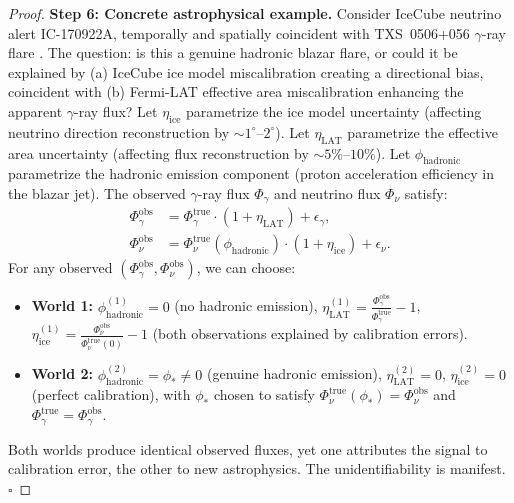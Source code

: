 \documentclass[11pt,a4paper]{article}
\theoremstyle{definition}
\begin{document}
\begin{proof}
\textbf{Step 6: Concrete astrophysical example.}
Consider IceCube neutrino alert IC-170922A, temporally and spatially coincident with TXS~0506+056 $\gamma$-ray flare \cite{IceCubeNeutrino2018}. The question: is this a genuine hadronic blazar flare, or could it be explained by (a) IceCube ice model miscalibration creating a directional bias, coincident with (b) Fermi-LAT effective area miscalibration enhancing the apparent $\gamma$-ray flux?
Let $\eta_{\mathrm{ice}}$ parametrize the ice model uncertainty (affecting neutrino direction reconstruction by $\sim 1^\circ$--$2^\circ$). Let $\eta_{\mathrm{LAT}}$ parametrize the effective area uncertainty (affecting flux reconstruction by $\sim 5\%$--$10\%$). Let $\phi_{\mathrm{hadronic}}$ parametrize the hadronic emission component (proton acceleration efficiency in the blazar jet).
The observed $\gamma$-ray flux $\Phi_{\gamma}$ and neutrino flux $\Phi_{\nu}$ satisfy:
\begin{align}
\Phi_{\gamma}^{\mathrm{obs}} &= \Phi_{\gamma}^{\mathrm{true}} \cdot (1 + \eta_{\mathrm{LAT}}) + \epsilon_{\gamma}, \\
\Phi_{\nu}^{\mathrm{obs}} &= \Phi_{\nu}^{\mathrm{true}}(\phi_{\mathrm{hadronic}}) \cdot (1 + \eta_{\mathrm{ice}}) + \epsilon_{\nu}.
\end{align}
For any observed $(\Phi_{\gamma}^{\mathrm{obs}}, \Phi_{\nu}^{\mathrm{obs}})$, we can choose:
\begin{itemize}
    \item \textbf{World 1:} $\phi_{\mathrm{hadronic}}^{(1)} = 0$ (no hadronic emission), $\eta_{\mathrm{LAT}}^{(1)} = \frac{\Phi_{\gamma}^{\mathrm{obs}}}{\Phi_{\gamma}^{\mathrm{true}}} - 1$, $\eta_{\mathrm{ice}}^{(1)} = \frac{\Phi_{\nu}^{\mathrm{obs}}}{\Phi_{\nu}^{\mathrm{true}}(0)} - 1$ (both observations explained by calibration errors).
    \item \textbf{World 2:} $\phi_{\mathrm{hadronic}}^{(2)} = \phi_* \neq 0$ (genuine hadronic emission), $\eta_{\mathrm{LAT}}^{(2)} = 0$, $\eta_{\mathrm{ice}}^{(2)} = 0$ (perfect calibration), with $\phi_*$ chosen to satisfy $\Phi_{\nu}^{\mathrm{true}}(\phi_*) = \Phi_{\nu}^{\mathrm{obs}}$ and $\Phi_{\gamma}^{\mathrm{true}} = \Phi_{\gamma}^{\mathrm{obs}}$.
\end{itemize}
Both worlds produce identical observed fluxes, yet one attributes the signal to calibration error, the other to new astrophysics. The unidentifiability is manifest. $\square$
\end{proof}
\end{document}
